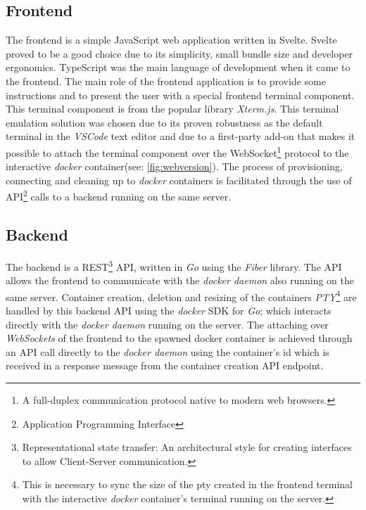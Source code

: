 \subsection{Frontend} The frontend is a simple JavaScript web application
written in Svelte. Svelte proved to be a good choice due to its simplicity,
small bundle size and developer ergonomics. TypeScript was the main language of
development when it came to the frontend. The main role of the frontend
application is to provide some instructions and to present the user with a
special frontend terminal component. This terminal component is from the
popular library \textit{Xterm.js}. This terminal emulation solution was chosen
due to its proven robustness as the default terminal in the \textit{VSCode}
text editor and due to a first-party add-on that makes it possible to attach
the terminal component over the WebSocket\footnote{A full-duplex communication
protocol native to modern web browsers.} protocol to the interactive
\textit{docker} container(see: \autoref{fig:webversion}). The process of
provisioning, connecting and cleaning up to \textit{docker} containers is
facilitated through the use of API\footnote{Application Programming Interface}
calls to a backend running on the same server. 

\subsection{Backend} The backend is a REST\footnote{Representational state
transfer: An architectural style for creating interfaces to allow Client-Server
communication.} API, written in \textit{Go} using the \textit{Fiber} library.
The API allows the frontend to communicate with the \textit{docker daemon} also
running on the same server. Container creation, deletion and resizing of the
containers \textit{PTY}\footnote{This is necessary to sync the size of the pty
created in the frontend terminal with the interactive \textit{docker}
container's terminal running on the server.} are handled by this backend API
using the \textit{docker} SDK for \textit{Go}; which interacts directly with
the \textit{docker daemon} running on the server. The attaching over
\textit{WebSockets} of the frontend to the spawned docker container is achieved
through an API call directly to the \textit{docker daemon} using the
container's id which is received in a response message from the container
creation API endpoint.

